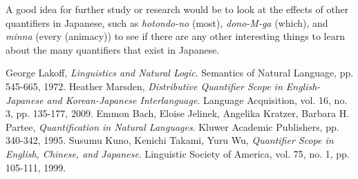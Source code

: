 \documentclass[english, 11pt]{article}
\begin{document}
A good idea for further study or research would be to look at the effects of other quantifiers in Japanese, such as \emph{hotondo-no} (most), \emph{dono-M-ga} (which), and \emph{minna} (every (animacy)) to see if there are any other interesting things to learn about the many quantifiers that exist in Japanese.

\begin{thebibliography}{999}
	George Lakoff,
  	\emph{Linguistics and Natural Logic}.
  	Semantics of Natural Language, pp. 545-665,
  	1972.
	Heather Marsden,
  	\emph{Distributive Quantifier Scope in English-Japanese and Korean-Japanese Interlanguage}.
  	Language Acquisition, vol. 16, no. 3, pp. 135-177,
  	2009.
	Emmon Bach, Eloise Jelinek, Angelika Kratzer, Barbara H. Partee,
  	\emph{Quantification in Natural Languages}.
  	Kluwer Academic Publishers, pp. 340-342,
  	1995.
	Susumu Kuno, Kenichi Takami, Yuru Wu,
  	\emph{Quantifier Scope in English, Chinese, and Japanese}.
  	Linguistic Society of America, vol. 75, no. 1, pp. 105-111,
  	1999.
\end{thebibliography}

\end{document}
